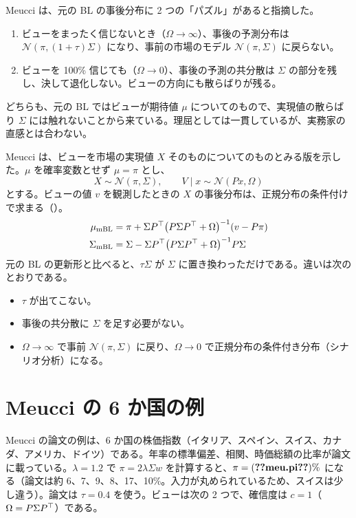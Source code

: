 Meucci は、元の BL の事後分布に 2 つの「パズル」があると指摘した。

\begin{enumerate}
\item ビューをまったく信じないとき（$\Omega\to\infty$）、事後の予測分布は $\mathcal N(\pi,(1+\tau)\Sigma)$ になり、事前の市場のモデル $\mathcal N(\pi,\Sigma)$ に戻らない。
\item ビューを 100\% 信じても（$\Omega\to0$）、事後の予測の共分散は $\Sigma$ の部分を残し、決して退化しない。ビューの方向にも散らばりが残る。
\end{enumerate}

どちらも、元の BL ではビューが期待値 $\mu$ についてのもので、実現値の散らばり $\Sigma$ には触れないことから来ている。理屈としては一貫しているが、実務家の直感とは合わない。

Meucci は、ビューを市場の実現値 $X$ そのものについてのものとみる版を示した。$\mu$ を確率変数とせず $\mu=\pi$ とし、
\begin{equation}
X\sim\mathcal N(\pi,\Sigma),\qquad V\mid x\sim\mathcal N(Px,\Omega)
\end{equation}
とする。ビューの値 $v$ を観測したときの $X$ の事後分布は、正規分布の条件付けで求まる（）。
\begin{align}
\mu_{\mathrm{mBL}}&=\pi+\Sigma P^{\top}\bigl(P\Sigma P^{\top}+\Omega\bigr)^{-1}(v-P\pi)\label{eq:mbl-mu}\\
\Sigma_{\mathrm{mBL}}&=\Sigma-\Sigma P^{\top}\bigl(P\Sigma P^{\top}+\Omega\bigr)^{-1}P\Sigma\label{eq:mbl-sigma}
\end{align}
元の BL の更新形と比べると、$\tau\Sigma$ が $\Sigma$ に置き換わっただけである。違いは次のとおりである。

\begin{itemize}
\item $\tau$ が出てこない。
\item 事後の共分散に $\Sigma$ を足す必要がない。
\item $\Omega\to\infty$ で事前 $\mathcal N(\pi,\Sigma)$ に戻り、$\Omega\to0$ で正規分布の条件付き分布（シナリオ分析）になる。
\end{itemize}

\section{Meucci の 6 か国の例}

Meucci の論文の例は、6 か国の株価指数（イタリア、スペイン、スイス、カナダ、アメリカ、ドイツ）である。年率の標準偏差、相関、時価総額の比率が論文に載っている。$\lambda=1.2$ で $\pi=2\lambda\Sigma w$ を計算すると、$\pi=(\V{meu.pi})\%$ になる（論文は約 6、7、9、8、17、10\%。入力が丸められているため、スイスは少し違う）。論文は $\tau=0.4$ を使う。ビューは次の 2 つで、確信度は $c=1$（$\Omega=P\Sigma P^{\top}$）である。

